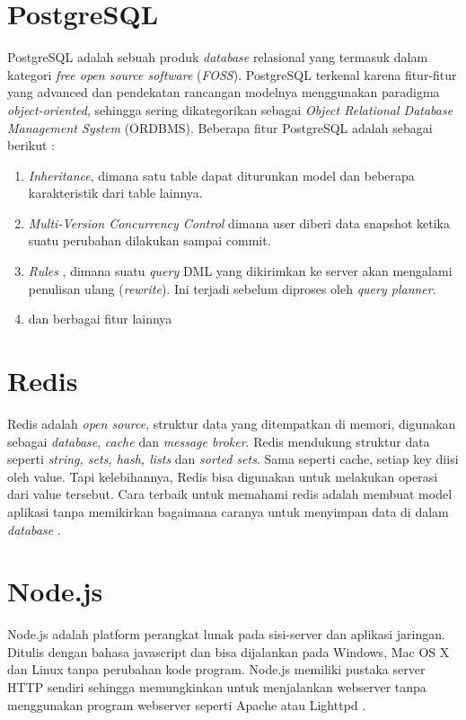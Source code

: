    \section{PostgreSQL}
    PostgreSQL adalah sebuah produk \textit{database} relasional yang termasuk dalam kategori \textit{free open source software} (\textit{FOSS}). 
	PostgreSQL terkenal karena fitur-fitur yang advanced dan pendekatan rancangan modelnya menggunakan paradigma \textit{object-oriented}, sehingga sering dikategorikan sebagai \textit{Object Relational Database Management System} (ORDBMS).
    Beberapa fitur PostgreSQL adalah sebagai berikut :
    \begin{enumerate}
    \item \textit{Inheritance}, dimana satu table dapat diturunkan model dan beberapa karakteristik dari table lainnya.
    \item \textit{Multi-Version Concurrency Control} dimana user diberi data snapshot ketika suatu perubahan dilakukan sampai commit.
    \item \textit{Rules} , dimana suatu \textit{query} DML yang dikirimkan ke server akan mengalami penulisan ulang (\textit{rewrite}). Ini terjadi sebelum diproses oleh \textit{query planner}.
    \item dan berbagai fitur lainnya \cite{noauthor_postgresql_nodate}
    \end{enumerate}
    
  \section{Redis}
    Redis adalah \textit{open source}, struktur data yang ditempatkan di memori, digunakan sebagai \textit{database}, \textit{cache} dan \textit{message broker}. Redis mendukung struktur data seperti \textit{string, sets, hash, lists} dan \textit{sorted sets}. Sama seperti cache, setiap key diisi oleh value. Tapi kelebihannya, Redis bisa digunakan untuk melakukan operasi dari value tersebut. Cara terbaik untuk memahami redis adalah membuat model aplikasi tanpa memikirkan bagaimana caranya untuk menyimpan data di dalam \textit{database} \cite{yudana_redis_2015}.

  \section{Node.js}
  Node.js adalah platform perangkat lunak pada sisi-server dan aplikasi jaringan. Ditulis dengan bahasa javascript dan bisa dijalankan pada Windows, Mac OS X dan Linux tanpa perubahan kode program. Node.js memiliki pustaka server HTTP sendiri sehingga memungkinkan untuk menjalankan webserver tanpa menggunakan program webserver seperti Apache atau Lighttpd \cite{noauthor_node.js_2014}.
  
